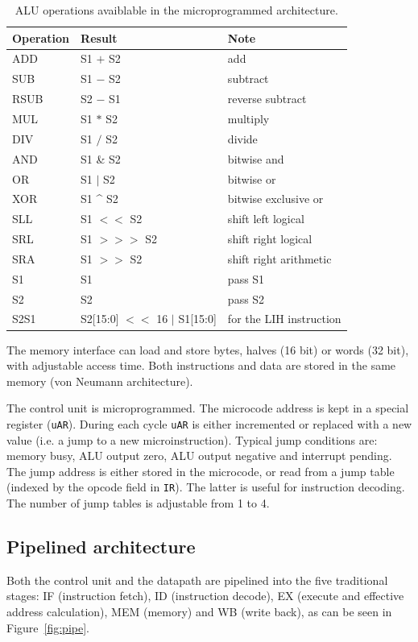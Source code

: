 \documentclass{article}
\begin{document}
\begin{table}
\begin{tabular}{l|l|l}
Operation 	& Result 			& Note  \\
\hline
ADD		& S1 $+$ S2			& add \\
SUB		& S1 $-$ S2			& subtract \\
RSUB		& S2 $-$ S1			& reverse subtract \\
MUL		& S1 $*$ S2			& multiply \\
DIV		& S1 $/$ S2			& divide \\
AND		& S1 \& S2			& bitwise and \\
OR		& S1 $|$ S2			& bitwise or \\
XOR		& S1 \^{} S2			& bitwise exclusive or \\
SLL		& S1 $<<$ S2			& shift left logical \\
SRL		& S1 $>>>$ S2			& shift right logical \\
SRA		& S1 $>>$ S2 			& shift right arithmetic \\
S1		& S1				& pass S1 \\
S2		& S2				& pass S2 \\
S2S1		& S2[15:0] $<<$ 16 $|$ S1[15:0]	& for the LIH instruction
\end{tabular}
\caption{ALU operations avaiblable in the microprogrammed architecture.}
\label{table:microops}
\end{table}

The memory interface can load and store bytes, halves (16 bit) or words (32 bit), with adjustable access time. Both
instructions and data are stored in the same memory (von Neumann architecture).

The control unit is microprogrammed. The microcode address is kept in a special register (\texttt{uAR}). During each cycle \texttt{uAR}
 is either incremented or replaced with a new value (i.e. a jump to a 
new microinstruction). Typical jump conditions are: memory busy, ALU 
output zero, ALU output negative and interrupt pending. The jump address
 is either stored in the microcode, or read from a jump table (indexed 
by the opcode field in \texttt{IR}). The latter is useful for instruction decoding. The number of jump tables is adjustable from 1 to 4.

\subsection{Pipelined architecture}
Both the control unit and the datapath are pipelined into the five 
traditional stages: IF (instruction fetch), ID (instruction decode), EX 
(execute and effective address calculation), MEM (memory) and WB (write 
back), as can be seen in Figure~\ref{fig:pipe}.
\end{document}
